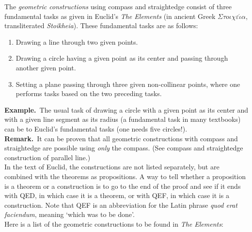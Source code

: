 \documentclass[12pt]{article}
\theoremstyle{definition}
\begin{document}
The \emph{geometric constructions} using compass and straightedge consist of three  fundamental tasks as given in  Euclid's {\em The Elements} (in ancient Greek $\Sigma\tau{o}\iota\chi\varepsilon\acute\iota\alpha$, transliterated {\em Stoikheia}). These fundamental tasks are as follows:

\begin{enumerate}
\item Drawing a line through two given points.
\item Drawing a circle having a given point as its center and passing through another given point.
\item Setting a plane passing through three given non-collinear points, where one performs tasks based on the two preceding tasks.
\end{enumerate}


\textbf{Example.}\, The usual task of drawing a circle with a given point as its center and with a given line segment as its radius (a fundamental task in many textbooks) can be  to Euclid's fundamental tasks (one needs five circles!).\\

\textbf{Remark.}\, It can be proven that all geometric constructions with compass and straightedge are possible using \emph{only} the compass.  (See  compass and straightedge construction of parallel line.)\\

In the text of Euclid, the constructions are not listed separately, but are combined with the theorems as
propositions.  A way to tell whether a proposition is a theorem or a construction is to go to the end of
the proof and see if it ends with QED, in which case it is a theorem, or with QEF, in which case it 
is a construction.  Note that QEF is an abbreviation for the Latin phrase \emph{quod erat faciendum}, meaning `which was to be done'.\\

Here is a list of the geometric constructions to be found in \emph{The Elements}:
\end{document}
